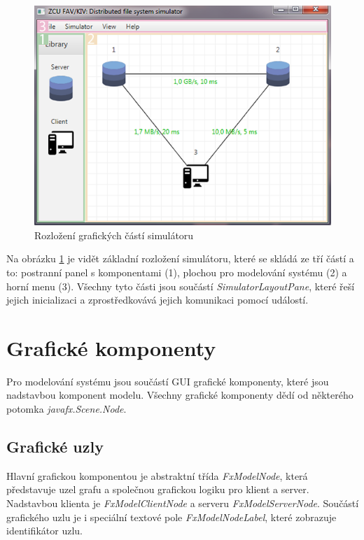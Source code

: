 \documentclass[czech,DP]{thesiskiv}
\begin{document}
\begin{figure}[H]
\centering
	\includegraphics{img/rozlozeni_alt.png}
\caption{Rozložení grafických částí simulátoru}
\label{fig:gui_rozlozeni}
\end{figure}

Na obrázku \ref{fig:gui_rozlozeni} je vidět základní rozložení simulátoru, které se skládá ze tří částí a to: postranní panel s komponentami (1), plochou pro modelování systému (2) a horní menu (3). Všechny tyto části jsou součástí \textit{SimulatorLayoutPane}, které řeší jejich inicializaci a zprostředkovává jejich komunikaci pomocí událostí.

\section{Grafické komponenty}

Pro modelování systému jsou součástí GUI grafické komponenty, které jsou nadstavbou komponent modelu. Všechny grafické komponenty dědí od některého potomka \textit{javafx.Scene.Node}.

\subsection{Grafické uzly}

Hlavní grafickou komponentou je abstraktní třída \textit{FxModelNode}, která představuje uzel grafu a společnou grafickou logiku pro klient a server. Nadstavbou klienta je \textit{FxModelClientNode} a serveru \textit{FxModelServerNode}. Součástí grafického uzlu je i speciální textové pole \textit{FxModelNodeLabel}, které zobrazuje identifikátor uzlu.
\end{document}
